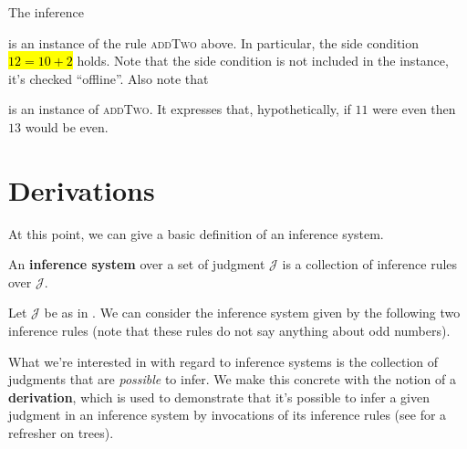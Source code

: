 \begin{example}
  The inference
  \begin{mathpar}
  \end{mathpar}
  is an instance of the rule \textsc{addTwo} above.
  In particular, the side condition \hl{$12 = 10 + 2$} holds.
  Note that the side condition is not included in the instance, it's checked \enquote{offline}.
  Also note that
  \begin{mathpar}
  \end{mathpar}
  is an instance of \textsc{addTwo}.
  It expresses that, hypothetically, if $11$ were even then $13$ would be even.
\end{example}

\section{Derivations}

At this point, we can give a basic definition of an inference system.

\begin{definition}
  An \textbf{inference system} over a set of judgment $\mathcal J$ is a collection of inference rules over $\mathcal J$.
\end{definition}

\begin{example}
  \label{ex:even-system}
  Let $\mathcal J$ be as in .
  We can consider the inference system given by the following two inference rules (note that these rules do not say anything about odd numbers).
\end{example}
%
What we're interested in with regard to inference systems is the collection of judgments that are \textit{possible} to infer.
We make this concrete with the notion of a \textbf{derivation}, which is used to demonstrate that it's possible to infer a given judgment in an inference system by invocations of its inference rules (see  for a refresher on trees).


